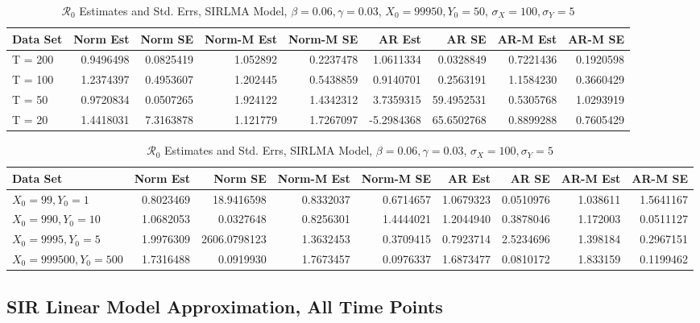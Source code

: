 \documentclass[12pt]{article}
\newcommand{\rr}{\ensuremath{\mathcal{R}_0}}
\begin{document}
\begin{table}[H]
	
	\caption{\label{tab:}$\rr$ Estimates and Std. Errs, SIRLMA Model,
		$\beta = 0.06, \gamma = 0.03$, $X_0 = 99950, Y_0 = 50$, $\sigma_X = 100, \sigma_Y = 5$}
	\centering
	\begin{tabular}[t]{l|r|r|r|r|r|r|r|r}
		\hline
		Data Set & Norm Est & Norm SE & Norm-M Est & Norm-M SE & AR Est & AR SE & AR-M Est & AR-M SE\\
		\hline
		T = 200 & 0.9496498 & 0.0825419 & 1.052892 & 0.2237478 & 1.0611334 & 0.0328849 & 0.7221436 & 0.1920598\\
		\hline
		T = 100 & 1.2374397 & 0.4953607 & 1.202445 & 0.5438859 & 0.9140701 & 0.2563191 & 1.1584230 & 0.3660429\\
		\hline
		T = 50 & 0.9720834 & 0.0507265 & 1.924122 & 1.4342312 & 3.7359315 & 59.4952531 & 0.5305768 & 1.0293919\\
		\hline
		T = 20 & 1.4418031 & 7.3163878 & 1.121779 & 1.7267097 & -5.2984368 & 65.6502768 & 0.8899288 & 0.7605429\\
		\hline
	\end{tabular}
\end{table}

\begin{table}[H]
	
	\caption{\label{tab:}$\rr$ Estimates and Std. Errs, SIRLMA Model,
		$\beta = 0.06, \gamma = 0.03$, $\sigma_X = 100, \sigma_Y = 5$}
	\centering
	\begin{tabular}[t]{l|r|r|r|r|r|r|r|r}
		\hline
		Data Set & Norm Est & Norm SE & Norm-M Est & Norm-M SE & AR Est & AR SE & AR-M Est & AR-M SE\\
		\hline
		$X_0 = 99, Y_0 = 1$ & 0.8023469 & 18.9416598 & 0.8332037 & 0.6714657 & 1.0679323 & 0.0510976 & 1.038611 & 1.5641167\\
		\hline
		$X_0 = 990, Y_0 = 10$ & 1.0682053 & 0.0327648 & 0.8256301 & 1.4444021 & 1.2044940 & 0.3878046 & 1.172003 & 0.0511127\\
		\hline
		$X_0 = 9995, Y_0 = 5$ & 1.9976309 & 2606.0798123 & 1.3632453 & 0.3709415 & 0.7923714 & 2.5234696 & 1.398184 & 0.2967151\\
		\hline
		$X_0 = 999500, Y_0 = 500$ & 1.7316488 & 0.0919930 & 1.7673457 & 0.0976337 & 1.6873477 & 0.0810172 & 1.833159 & 0.1199462\\
		\hline
	\end{tabular}
\end{table}

\subsection{SIR Linear Model Approximation, All Time Points}
\end{document}
